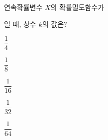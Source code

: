 연속확률변수 $X$의 확률밀도함수가\par\smallskip{}\par\smallskip\noindent 일 때, 상수 $k$의 값은?
\begin{choicesii}{\rule[-3ex]{0pt}{8ex}$\dfrac{1}{4}$}{\rule[-3ex]{0pt}{8ex}$\dfrac{1}{8}$}{\rule[-3ex]{0pt}{8ex}$\dfrac{1}{16}$}{\rule[-3ex]{0pt}{8ex}$\dfrac{1}{32}$}{\rule[-3ex]{0pt}{8ex}$\dfrac{1}{64}$}\end{choicesii}
